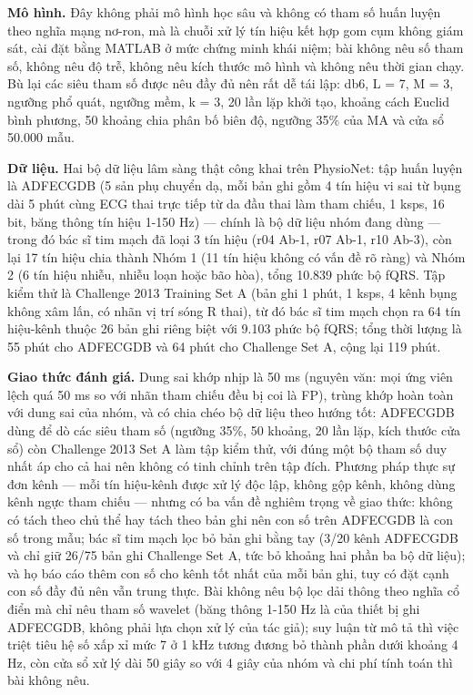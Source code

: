 \documentclass[12pt,a4paper]{article}
\begin{document}
\noindent \textbf{Mô hình.} Đây không phải mô hình học sâu và không có tham số huấn luyện theo nghĩa mạng nơ-ron, mà là chuỗi xử lý tín hiệu kết hợp gom cụm không giám sát, cài đặt bằng MATLAB ở mức chứng minh khái niệm; bài không nêu số tham số, không nêu độ trễ, không nêu kích thước mô hình và không nêu thời gian chạy. Bù lại các siêu tham số được nêu đầy đủ nên rất dễ tái lập: db6, L = 7, M = 3, ngưỡng phổ quát, ngưỡng mềm, k = 3, 20 lần lặp khởi tạo, khoảng cách Euclid bình phương, 50 khoảng chia phân bố biên độ, ngưỡng 35\% của MA và cửa sổ 50.000 mẫu.\par\vspace{3pt}
\noindent \textbf{Dữ liệu.} Hai bộ dữ liệu lâm sàng thật công khai trên PhysioNet: tập huấn luyện là ADFECGDB (5 sản phụ chuyển dạ, mỗi bản ghi gồm 4 tín hiệu vi sai từ bụng dài 5 phút cùng ECG thai trực tiếp từ da đầu thai làm tham chiếu, 1 ksps, 16 bit, băng thông tín hiệu 1-150 Hz) — chính là bộ dữ liệu nhóm đang dùng — trong đó bác sĩ tim mạch đã loại 3 tín hiệu (r04 Ab-1, r07 Ab-1, r10 Ab-3), còn lại 17 tín hiệu chia thành Nhóm 1 (11 tín hiệu không có vấn đề rõ ràng) và Nhóm 2 (6 tín hiệu nhiễu, nhiễu loạn hoặc bão hòa), tổng 10.839 phức bộ fQRS. Tập kiểm thử là Challenge 2013 Training Set A (bản ghi 1 phút, 1 ksps, 4 kênh bụng không xâm lấn, có nhãn vị trí sóng R thai), từ đó bác sĩ tim mạch chọn ra 64 tín hiệu-kênh thuộc 26 bản ghi riêng biệt với 9.103 phức bộ fQRS; tổng thời lượng là 55 phút cho ADFECGDB và 64 phút cho Challenge Set A, cộng lại 119 phút.\par\vspace{3pt}
\noindent \textbf{Giao thức đánh giá.} Dung sai khớp nhịp là 50 ms (nguyên văn: mọi ứng viên lệch quá 50 ms so với nhãn tham chiếu đều bị coi là FP), trùng khớp hoàn toàn với dung sai của nhóm, và có chia chéo bộ dữ liệu theo hướng tốt: ADFECGDB dùng để dò các siêu tham số (ngưỡng 35\%, 50 khoảng, 20 lần lặp, kích thước cửa sổ) còn Challenge 2013 Set A làm tập kiểm thử, với đúng một bộ tham số duy nhất áp cho cả hai nên không có tinh chỉnh trên tập đích. Phương pháp thực sự đơn kênh — mỗi tín hiệu-kênh được xử lý độc lập, không gộp kênh, không dùng kênh ngực tham chiếu — nhưng có ba vấn đề nghiêm trọng về giao thức: không có tách theo chủ thể hay tách theo bản ghi nên con số trên ADFECGDB là con số trong mẫu; bác sĩ tim mạch lọc bỏ bản ghi bằng tay (3/20 kênh ADFECGDB và chỉ giữ 26/75 bản ghi Challenge Set A, tức bỏ khoảng hai phần ba bộ dữ liệu); và họ báo cáo thêm con số cho kênh tốt nhất của mỗi bản ghi, tuy có đặt cạnh con số đầy đủ nên vẫn trung thực. Bài không nêu bộ lọc dải thông theo nghĩa cổ điển mà chỉ nêu tham số wavelet (băng thông 1-150 Hz là của thiết bị ghi ADFECGDB, không phải lựa chọn xử lý của tác giả); suy luận từ mô tả thì việc triệt tiêu hệ số xấp xỉ mức 7 ở 1 kHz tương đương bỏ thành phần dưới khoảng 4 Hz, còn cửa sổ xử lý dài 50 giây so với 4 giây của nhóm và chi phí tính toán thì bài không nêu.\par\vspace{3pt}
\end{document}
